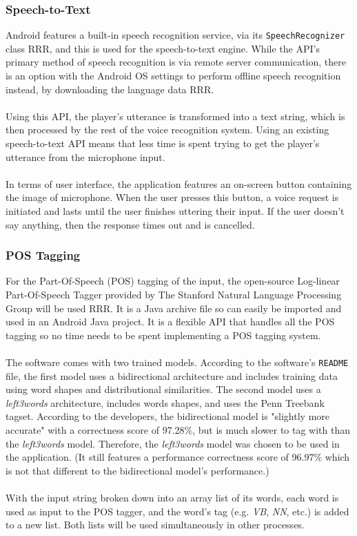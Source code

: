 \documentclass[12pt]{article}
\begin{document}
\subsubsection{Speech-to-Text}

Android features a built-in speech recognition service, via its \texttt{SpeechRecognizer} class RRR, and this is used for the speech-to-text engine. While the API's primary method of speech recognition is via remote server communication, there is an option with the Android OS settings to perform offline speech recognition instead, by downloading the language data RRR.
\\
\\
Using this API, the player's utterance is transformed into a text string, which is then processed by the rest of the voice recognition system. Using an existing speech-to-text API means that less time is spent trying to get the player's utterance from the microphone input.
\\
\\
In terms of user interface, the application features an on-screen button containing the image of microphone. When the user presses this button, a voice request is initiated and lasts until the user finishes uttering their input. If the user doesn't say anything, then the response times out and is cancelled.

\subsubsection{POS Tagging}

For the Part-Of-Speech (POS) tagging of the input, the open-source Log-linear Part-Of-Speech Tagger provided by The Stanford Natural Language Processing Group will be used RRR. It is a Java archive file so can easily be imported and used in an Android Java project. It is a flexible API that handles all the POS tagging so no time needs to be spent implementing a POS tagging system. 
\\
\\
The software comes with two trained models. According to the software's \texttt{README} file, the first model uses a bidirectional architecture and includes training data using word shapes and distributional similarities. The second model uses a \textit{left3words} architecture, includes words shapes, and uses the Penn Treebank tagset. According to the developers, the bidirectional model is "slightly more accurate" with a correctness score of 97.28\%, but is much slower to tag with than the \textit{left3words} model. Therefore, the \textit{left3words} model was chosen to be used in the application. (It still features a performance correctness score of 96.97\% which is not that different to the bidirectional model's performance.)
\\
\\
With the input string broken down into an array list of its words, each word is used as input to the POS tagger, and the word's tag (e.g. \textit{VB}, \textit{NN}, etc.) is added to a new list. Both lists will be used simultaneously in other processes.
\end{document}
